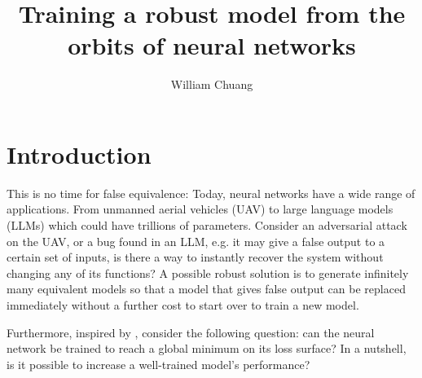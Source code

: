 \documentclass{article}
\theoremstyle{plain}
\theoremstyle{plain} %
\theoremstyle{definition}  %
\theoremstyle{remark}  %
\theoremstyle{plain}
\begin{document}
\title{Training a robust model from the orbits of neural networks}

\author{William Chuang}

\maketitle


\section{Introduction}
This is no time for false equivalence: Today, neural networks have a wide range of applications. From unmanned aerial vehicles (UAV) to large language models (LLMs) which could have trillions of parameters. Consider an adversarial attack\cite{ma2018mode,tramer2017ensemble,athalye2018obfuscated} on the UAV, or a bug found in an LLM, e.g. it may give a false output to a certain set of inputs, is there a way to instantly recover the system without changing any of its functions? A possible robust solution is to generate infinitely many equivalent models so that a model that gives false output can be replaced immediately without a further cost to start over to train a new model.

Furthermore, inspired by \cite{yun2017global, blum1988training, judd1990neural}, consider the following question: can the neural network be trained to reach a global minimum on its loss surface\cite{li2018visualizing,garipov2018loss, malan2021survey, draxler2018essentially, freeman2016topology, du2019gradient, goodfellow2014qualitatively, im2016empirical, dinh2017sharp, kawaguchi2017generalization, neyshabur2017exploring, nguyen2018loss, choromanska2015loss, nguyen2017loss, kumar2023black, poole2016exponential, zhang2021embedding, lucas2022optimization, bronstein2021geometric}? In a nutshell, is it possible to increase a well-trained model's performance?


\end{document}
